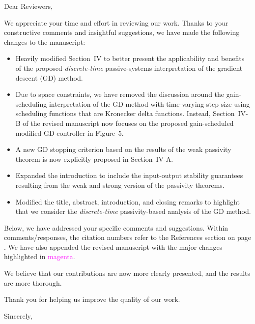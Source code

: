 Dear Reviewers,

We appreciate your time and effort in reviewing our work. Thanks to your constructive comments and insightful suggestions, we have made the following changes to the manuscript:
\begin{itemize}
    \item{%
        Heavily modified Section~IV to better present the applicability and benefits of the proposed \emph{discrete-time} passive-systems interpretation of the gradient descent (GD) method. 
    }%
    \item{%
        Due to space constraints, we have removed the discussion around the gain-scheduling interpretation of the GD method with time-varying step size using scheduling functions that are Kronecker delta functions. Instead, Section~IV-B of the revised manuscript now focuses on the proposed gain-scheduled modified GD controller in Figure~5.
    }%
    \item{%
        A new GD stopping criterion based on the results of the weak passivity theorem is now explicitly proposed in Section~IV-A.
    }%
    \item{%
        Expanded the introduction to include the input-output stability guarantees resulting from the weak and strong version of the passivity theorems. 
    }%
    \item{%
        Modified the title, abstract, introduction, and closing remarks to highlight that we consider the \emph{discrete-time} passivity-based analysis of the GD method.
    }%
    
\end{itemize}
Below, we have addressed your specific comments and suggestions. Within comments/responses, the citation numbers refer to the References section on page \pageref{endofcontent}. We have also appended the revised manuscript with the major changes highlighted in \textcolor{magenta}{magenta}.

We believe that our contributions are now more clearly presented, and the results are more thorough. 

Thank you for helping us improve the quality of our work.



Sincerely,\\[1em]%
\theauthor